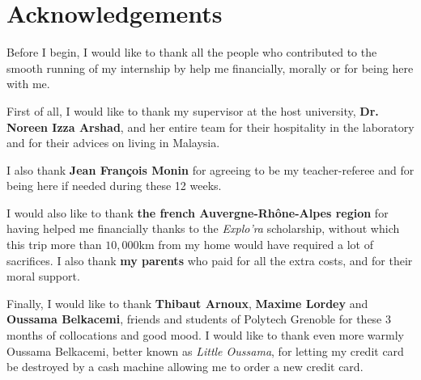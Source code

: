 \chapter*{Acknowledgements}

Before I begin, I would like to thank all the people who contributed to the smooth running of my internship by help me financially, morally or for being here with me.

First of all, I would like to thank my supervisor at the host university, \textbf{Dr. Noreen Izza Arshad}, and her entire team for their hospitality in the laboratory and for their advices on living in Malaysia.

I also thank \textbf{Jean François Monin} for agreeing to be my teacher-referee and for being here if needed during these 12 weeks.

I would also like to thank \textbf{the french Auvergne-Rhône-Alpes region} for having helped me financially thanks to the \textit{Explo'ra} scholarship, without which this trip more than $10,000$km from my home would have required a lot of sacrifices. I also thank \textbf{my parents} who paid for all the extra costs, and for their moral support.

Finally, I would like to thank \textbf{Thibaut Arnoux}, \textbf{Maxime Lordey} and \textbf{Oussama Belkacemi}, friends and students of Polytech Grenoble for these 3 months of collocations and good mood. I would like to thank even more warmly Oussama Belkacemi, better known as \textit{Little Oussama}, for letting my credit card be destroyed by a cash machine allowing me to order a new credit card.
